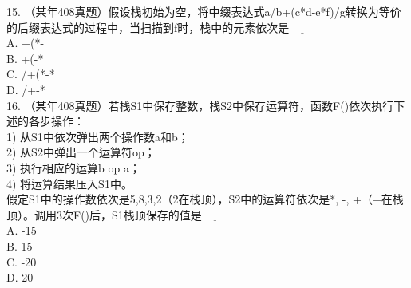 \begin{exercise}
    15. （某年408真题）假设栈初始为空，将中缀表达式a/b+(c*d-e*f)/g转换为等价的后缀表达式的过程中，当扫描到f时，栈中的元素依次是$\underline{\hspace{1cm}}$\\
A. +(*-\\
B. +(-*\\
C. /+(*-*\\
D. /+-*\\

    16. （某年408真题）若栈S1中保存整数，栈S2中保存运算符，函数F()依次执行下述的各步操作：\\
    1) 从S1中依次弹出两个操作数a和b；\\
    2) 从S2中弹出一个运算符op；\\
    3) 执行相应的运算b op a；\\
    4) 将运算结果压入S1中。\\
    假定S1中的操作数依次是5,8,3,2（2在栈顶），S2中的运算符依次是*, -, +（+在栈顶）。调用3次F()后，S1栈顶保存的值是$\underline{\hspace{1cm}}$\\
    A. -15\\
    B. 15\\
    C. -20\\
    D. 20\\


\end{exercise}
